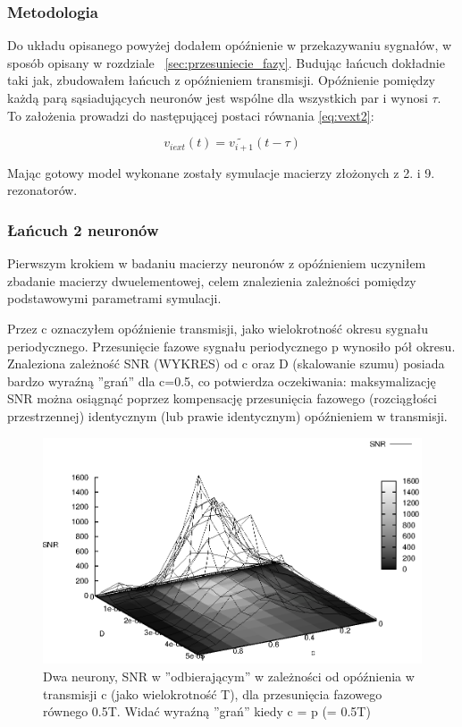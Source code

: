   \subsubsection{Metodologia}
  
  Do układu opisanego powyżej dodałem opóźnienie w przekazywaniu sygnałów, w sposób opisany w rozdziale ~\ref{sec:przesuniecie_fazy}. Budując łańcuch dokładnie taki jak, zbudowałem łańcuch z opóźnieniem transmisji. Opóźnienie pomiędzy każdą parą sąsiadujących neuronów jest wspólne dla wszystkich par i wynosi $\tau$. To założenia prowadzi do następującej postaci równania \ref{eq:vext2}:

  \begin{equation} \label{eq:vext3}
    v_{i ext}(t) = \widetilde{v_{i+1}}(t-\tau)
  \end{equation}

  Mając gotowy model wykonane zostały symulacje macierzy złożonych z 2. i 9. rezonatorów.

  
  \subsubsection{Łańcuch 2 neuronów}

  Pierwszym krokiem w badaniu macierzy neuronów z opóźnieniem uczyniłem zbadanie macierzy dwuelementowej, celem znalezienia zależności pomiędzy podstawowymi parametrami symulacji.

  Przez c oznaczyłem opóźnienie transmisji, jako wielokrotność okresu sygnału periodycznego. Przesunięcie fazowe sygnału periodycznego p wynosiło pół okresu.
  Znaleziona zależność SNR (WYKRES) od c oraz D (skalowanie szumu) posiada bardzo wyraźną ''grań'' dla c=0.5, co potwierdza oczekiwania: maksymalizację SNR można osiągnąć poprzez kompensację przesunięcia fazowego (rozciągłości przestrzennej) identycznym (lub prawie identycznym) opóźnieniem w transmisji.

  \begin{figure}
    \includegraphics[width=140mm]{images/2neuron/3d}
    \caption{Dwa neurony, SNR w ''odbierającym'' w zależności od opóźnienia w transmisji c (jako wielokrotność T), dla przesunięcia fazowego równego 0.5T. Widać wyraźną ''grań'' kiedy c = p (= 0.5T)}
    \label{fig:graphics:snr_c_d_3d}
  \end{figure}

